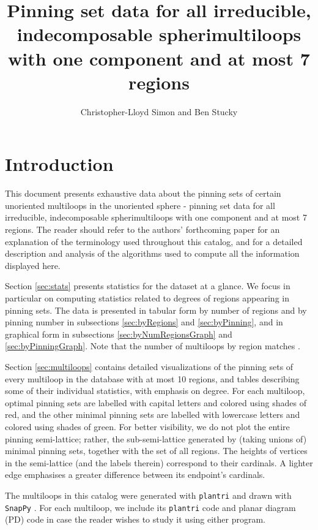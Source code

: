 \documentclass{article}%
\title{Pinning set data for all irreducible, indecomposable spherimultiloops with one component  and at most 7 regions}
\author{Christopher-Lloyd Simon and Ben Stucky}
\begin{document}
%
\maketitle

\tableofcontents

\newpage

\section{Introduction}
This document presents exhaustive data about the pinning sets of certain unoriented multiloops in the unoriented sphere - pinning set data for all irreducible, indecomposable spherimultiloops with one component  and at most 7 regions. The reader should refer to the authors' forthcoming paper \cite{Simon_Stucky_pintheloop_24} for an explanation of the terminology used throughout this catalog, and for a detailed description and analysis of the algorithms used to compute all the information displayed here.

Section \ref{sec:stats} presents statistics for the dataset at a glance. We focus in particular on computing statistics related to degrees of regions appearing in pinning sets. The data is presented in tabular form by number of regions and by pinning number in subsections \ref{sec:byRegions} and \ref{sec:byPinning}, and in graphical form in subsections \ref{sec:byNumRegionsGraph} and \ref{sec:byPinningGraph}. Note that the number of multiloops by region matches \cite[A264759]{oeis}. 

Section \ref{sec:multiloops} contains detailed visualizations of the pinning sets of every multiloop in the database with at most 10 regions, and tables describing some of their individual statistics, with emphasis on degree. For each multiloop, optimal pinning sets are labelled with capital letters and colored using shades of red, and the other minimal pinning sets are labelled with lowercase letters and colored using shades of green. For better visibility, we do not plot the entire pinning semi-lattice; rather, the sub-semi-lattice generated by (taking unions of) minimal pinning sets, together with the set of all regions. The heights of vertices in the semi-lattice (and the labels therein) correspond to their cardinals. A lighter edge emphasises a greater difference between its endpoint's cardinals.

The multiloops in this catalog were generated with \texttt{plantri} \cite{plantri} and drawn with \texttt{SnapPy} \cite{snappy}. For each multiloop, we include its \texttt{plantri} code and planar diagram (PD) code in case the reader wishes to study it using either program.
\end{document}
